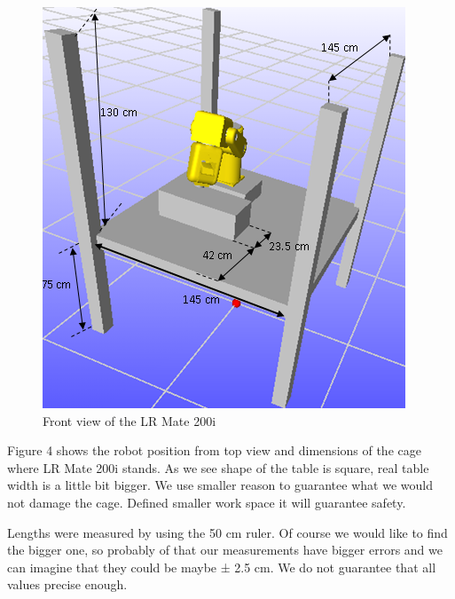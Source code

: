 \begin{figure}[H]
  \centering
  \includegraphics[scale= 0.7]{source/robworkCage.png}
  \caption{Front view of the LR Mate 200i}
  \label{fig:robworkCage}
\end{figure}

Figure 4 shows the robot position from top view and dimensions of the cage where LR Mate 200i stands. As we see shape of the table is square, real table width is a little bit bigger. We use smaller reason to guarantee what we would not damage the cage. Defined smaller work space it will guarantee safety.\newline

Lengths were measured by using the 50 cm ruler. Of course we would like to find the bigger one, so probably of that our measurements have bigger errors and we can imagine that they could be maybe ± 2.5 cm. We do not guarantee that all values precise enough.

